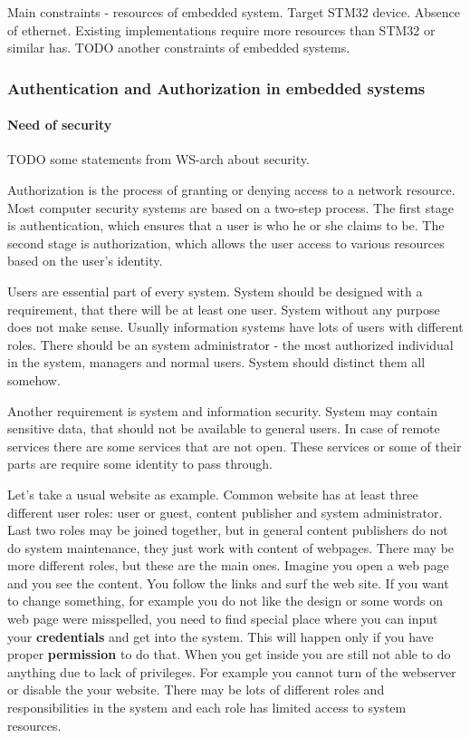 Main constraints - resources of embedded system.
Target STM32 device.
Absence of ethernet.
Existing implementations require more resources than STM32 or similar has.
TODO another constraints of embedded systems.


 

\subsubsection{Authentication and Authorization in embedded systems}
\paragraph{Need of security}
TODO some statements from WS-arch about security.


Authorization is the process of granting or denying access to a network resource.
Most computer security systems are based on a two-step process.
The first stage is authentication, which ensures that a user is who he or she claims to be.
The second stage is authorization, which allows the user access to various resources based on the user's identity. 

Users are essential part of every system. System should be designed with
a requirement, that there will be at least one user. System without any purpose
does not make sense. Usually information systems have lots of users with
different roles. There should be an system administrator - the most authorized individual
in the system, managers and normal users. System should distinct them all
somehow. 

Another requirement is system and information security. System may contain
sensitive data, that should not be available to general users. In case of remote
services there are some services that are not open. These services or some
of their parts are require some identity to pass through. 

Let's take a usual website as example. Common website has at least three
different user roles:
user or guest, content publisher and system administrator. Last two roles may be
joined together, but in general content publishers do not do system maintenance, they
just work with content of webpages. There may be more different roles, but these
are the main ones. Imagine you open a web page and you see the content. You
follow the links and surf the web site. If you want to change something, for
example you do not like the design or some words on web page were misspelled,
you need to find special place where you can input your \textbf{credentials} and
get into the system. This will happen only if you have proper
\textbf{permission} to do that. When you get inside you are still not able to do
anything due to lack of privileges. For example you cannot turn of the
webserver or disable the your website. There may be lots of different roles and
responsibilities in the system and each role has limited access to system
resources.

